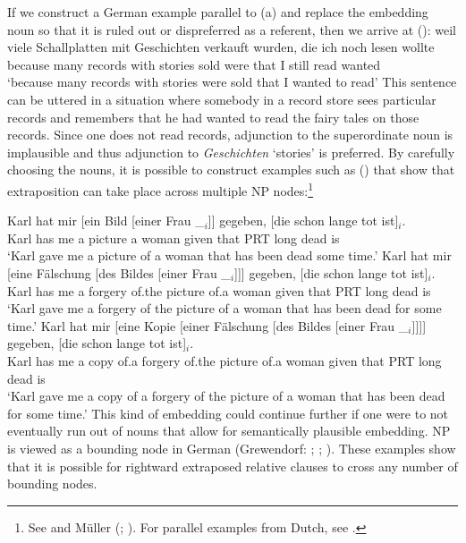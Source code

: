 If we construct a German example parallel to (a) and replace the embedding noun so that it is ruled out or dispreferred as a referent, then we arrive at ():
\ea
\gll weil viele Schallplatten mit Geschichten verkauft wurden, die ich noch lesen wollte\\
	 because many records with stories sold were that I still read wanted\\
\glt `because many records with stories were sold that I wanted to read'
\z
This sentence can be uttered in a situation where somebody in a record store sees particular records and remembers that he had
wanted to read the fairy tales on those records. Since one does not read records, adjunction to the superordinate noun is implausible
and thus adjunction to \emph{Geschichten} `stories' is preferred. By carefully choosing the nouns, it is possible to construct examples such as
() that show that extraposition can take place across multiple NP nodes:\footnote{
  See  and Müller (\citeyear{Mueller2004d};
  \citeyear[Section~3]{Mueller2007c}). For parallel examples from
  Dutch, see .  
}

\eal
\ex 
\gll Karl hat mir [ein Bild [einer Frau \_$_i$]] gegeben, [die schon lange tot ist]$_i$.\\
	 Karl has me  \spacebr{}a picture  \spacebr{}a woman {} given \spacebr{}that PRT long dead is\\
\glt `Karl gave me a picture of a woman that has been dead some time.'
\ex 
\gll Karl hat mir [eine Fälschung [des Bildes [einer Frau \_$_i$]]] gegeben, [die schon lange tot ist]$_i$.\\
	Karl has me \spacebr{}a forgery \spacebr{}of.the picture \spacebr{}of.a woman {} given \spacebr{}that PRT long dead is\\
\glt `Karl gave me a forgery of the picture of a woman that has been dead for some time.'
\ex 
\gll Karl hat mir [eine Kopie [einer Fälschung [des Bildes [einer Frau \_$_i$]]]] gegeben, [die schon lange tot ist]$_i$.\\
	 Karl has me \spacebr{}a copy \spacebr{}of.a forgery \spacebr{}of.the picture \spacebr{}of.a woman {} given \spacebr{}that PRT long dead is\\
\glt `Karl gave me a copy of a forgery of the picture of a woman that has been dead for some time.'
\zl
This kind of embedding could continue further if one were to not eventually run out of nouns that
allow for semantically plausible embedding.
NP is viewed as a bounding node in German (Grewendorf: \citeyear[]{Grewendorf88a};
\citeyear[--18]{Grewendorf2002a}; \citealp[]{Haider2001a}). These examples show that it is possible for rightward extraposed relative clauses
to cross any number of bounding nodes.

